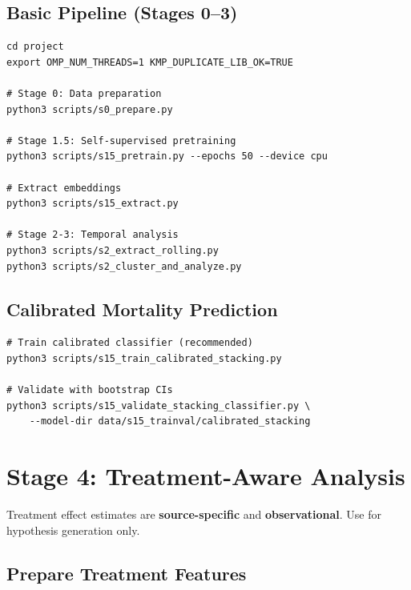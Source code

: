 \documentclass[11pt,a4paper]{article}
\begin{document}
\subsection{Basic Pipeline (Stages 0--3)}

\begin{lstlisting}[title={\faTerminal\hspace{0.5em}Terminal}]
cd project
export OMP_NUM_THREADS=1 KMP_DUPLICATE_LIB_OK=TRUE

# Stage 0: Data preparation
python3 scripts/s0_prepare.py

# Stage 1.5: Self-supervised pretraining
python3 scripts/s15_pretrain.py --epochs 50 --device cpu

# Extract embeddings
python3 scripts/s15_extract.py

# Stage 2-3: Temporal analysis
python3 scripts/s2_extract_rolling.py
python3 scripts/s2_cluster_and_analyze.py
\end{lstlisting}

\subsection{Calibrated Mortality Prediction}

\begin{lstlisting}[title={\faTerminal\hspace{0.5em}Terminal}]
# Train calibrated classifier (recommended)
python3 scripts/s15_train_calibrated_stacking.py

# Validate with bootstrap CIs
python3 scripts/s15_validate_stacking_classifier.py \
    --model-dir data/s15_trainval/calibrated_stacking
\end{lstlisting}

\section{Stage 4: Treatment-Aware Analysis}

\begin{infobox}
Treatment effect estimates are \textbf{source-specific} and \textbf{observational}. Use for hypothesis generation only.
\end{infobox}

\subsection{Prepare Treatment Features}
\end{document}
